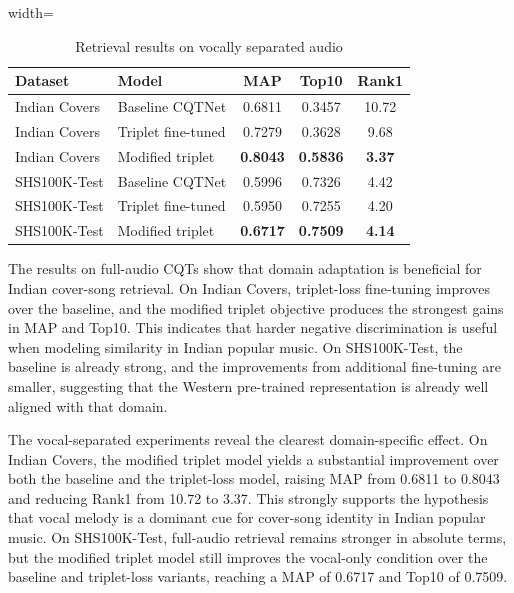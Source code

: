 \documentclass[conference]{IEEEtran}
\begin{document}
\begin{table}[htbp]
    \caption{Retrieval results on vocally separated audio}
    \centering
    \begin{adjustbox}{width=\columnwidth}
    \begin{tabular}{llccc}
    \toprule
    \textbf{Dataset} & \textbf{Model} & \textbf{MAP} & \textbf{Top10} & \textbf{Rank1} \\
    \midrule
    Indian Covers & Baseline CQTNet & 0.6811 & 0.3457 & 10.72 \\
    Indian Covers & Triplet fine-tuned & 0.7279 & 0.3628 & 9.68 \\
    Indian Covers & Modified triplet & \textbf{0.8043} & \textbf{0.5836} & \textbf{3.37} \\
    \midrule
    SHS100K-Test & Baseline CQTNet & 0.5996 & 0.7326 & 4.42 \\
    SHS100K-Test & Triplet fine-tuned & 0.5950 & 0.7255 & 4.20 \\
    SHS100K-Test & Modified triplet & \textbf{0.6717} & \textbf{0.7509} & \textbf{4.14} \\
    \bottomrule
    \end{tabular}
    \end{adjustbox}
\end{table}

The results on full-audio CQTs show that domain adaptation is beneficial for Indian cover-song retrieval. On Indian Covers, triplet-loss fine-tuning improves over the baseline, and the modified triplet objective produces the strongest gains in MAP and Top10. This indicates that harder negative discrimination is useful when modeling similarity in Indian popular music. On SHS100K-Test, the baseline is already strong, and the improvements from additional fine-tuning are smaller, suggesting that the Western pre-trained representation is already well aligned with that domain.

The vocal-separated experiments reveal the clearest domain-specific effect. On Indian Covers, the modified triplet model yields a substantial improvement over both the baseline and the triplet-loss model, raising MAP from 0.6811 to 0.8043 and reducing Rank1 from 10.72 to 3.37. This strongly supports the hypothesis that vocal melody is a dominant cue for cover-song identity in Indian popular music. On SHS100K-Test, full-audio retrieval remains stronger in absolute terms, but the modified triplet model still improves the vocal-only condition over the baseline and triplet-loss variants, reaching a MAP of 0.6717 and Top10 of 0.7509.
\end{document}
